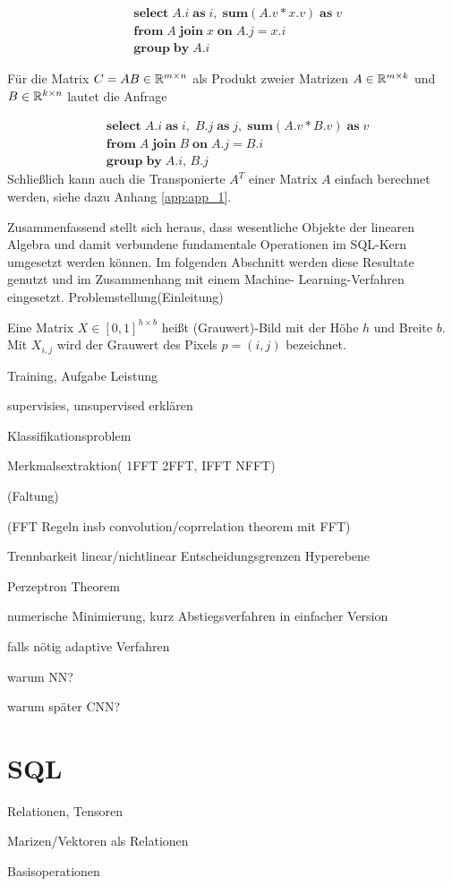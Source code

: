 \begin{align*}
    & \mathbf{select} \; A.i \; \mathbf{as} \; i, \; \mathbf{sum} (A.v*x.v) \; \mathbf{as} \; v\\
    & \mathbf{from} \; A \; \mathbf{join} \; x \; \mathbf{on} \; A.j=x.i \; \\
    & \mathbf{group} \; \mathbf{by} \; A.i
\end{align*}

Für die Matrix $C=AB \in \mathbb{R}^{m \times n}$ als Produkt zweier Matrizen $A \in \mathbb{R}^{m \times k}$ und $B \in \mathbb{R}^{k \times n}$ lautet die Anfrage

\begin{align*}
    & \mathbf{select} \; A.i \; \mathbf{as} \; i, \; B.j \; \mathbf{as} \; j, \; \mathbf{sum} (A.v*B.v) \; \mathbf{as} \; v\\
    & \mathbf{from} \; A \; \mathbf{join} \; B \; \mathbf{on} \; A.j=B.i \; \\
    & \mathbf{group} \; \mathbf{by} \; A.i, \, B.j
\end{align*}
Schließlich kann auch die Transponierte $A^T$ einer Matrix $A$ einfach berechnet werden, siehe dazu Anhang \ref{app:app_1}.

Zusammenfassend stellt sich heraus, dass wesentliche Objekte der linearen Algebra und damit verbundene fundamentale Operationen im SQL-Kern umgesetzt werden können.  
Im folgenden Abschnitt werden diese Resultate genutzt und im Zusammenhang mit einem Machine- Learning-Verfahren eingesetzt.
Problemstellung(Einleitung)

\begin{defi}
    \label{def:image}
    Eine Matrix $X \in [0,1]^{h \times b}$ heißt (Grauwert)-Bild mit der Höhe $h$ und Breite $b$. Mit $X_{i,j}$ wird der Grauwert des Pixels $p=(i,j)$ bezeichnet.
\end{defi}


Training, Aufgabe Leistung

supervisies, unsupervised erklären

Klassifikationsproblem

Merkmalsextraktion( 1FFT 2FFT, IFFT NFFT)

(Faltung)

(FFT Regeln insb convolution/coprrelation theorem mit FFT)

Trennbarkeit linear/nichtlinear Entscheidungsgrenzen Hyperebene

Perzeptron Theorem

numerische Minimierung, kurz Abstiegsverfahren in einfacher Version

falls nötig adaptive Verfahren

warum NN?

warum später CNN?


\section*{SQL}
Relationen, Tensoren

Marizen/Vektoren als Relationen

Basisoperationen

